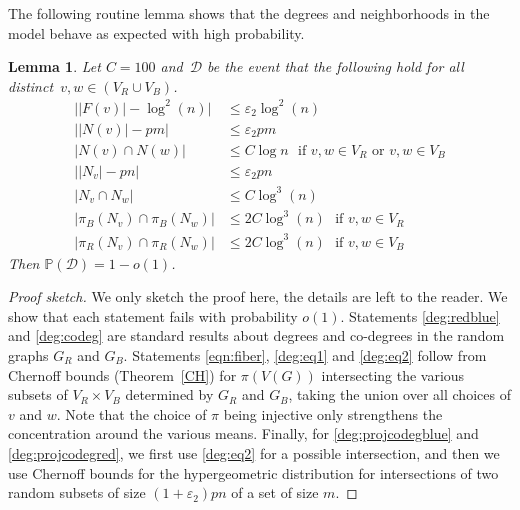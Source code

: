 \documentclass{article}
\newcommand{\p}{\mathbb{P}}
\newtheorem{lemma}[theorem]{Lemma}
\begin{document}
The following routine lemma shows that the degrees and neighborhoods in the model behave as expected with high probability. 
\begin{lemma}\label{lem:fiber_and_degree}
 Let $C=100$ %
 and~$\mathcal{D}$ be the event that the following hold for all distinct~$v,w \in (V_R \cup V_B)$.
    \begin{align} 
    \big| |F(v)| - \log^2 (n) \big| &\leq \varepsilon_2 \log^2 (n)
    \label{eqn:fiber}\\
    \big| |N(v)| - p{m} \big| & \leq \varepsilon_2 p{m}\label{deg:redblue} \\ 
	|N(v) \cap N(w)| & \leq C \log n \mbox{ ~if $v, w \in V_R$ or $v, w \in V_B$} \label{deg:codeg}\\   
    \big| |N_v|-pn \big| &\leq \varepsilon_2 pn \label{deg:eq1}\\
	|N_v \cap N_w| &\leq C \log^3 (n)  \label{deg:eq2}\\
	|\pi_B(N_v) \cap \pi_B(N_w)| &\leq 2C\log^3 (n) \mbox{ ~if $v, w \in V_R$} \label{deg:projcodegblue}
\\	|\pi_R(N_v) \cap \pi_R(N_w)| &\leq 2C \log^3 (n) \mbox{ ~if $v, w \in V_B$} \label{deg:projcodegred}
    \end{align}
    Then $\p(\mathcal{D})=1-o(1)$.
\end{lemma}
\begin{proof}[Proof sketch]
We only sketch the proof here, the details are left to the reader.
    We show that each statement fails with probability $o(1)$. Statements \eqref{deg:redblue} and \eqref{deg:codeg} are standard results about degrees and co-degrees in the random graphs $G_R$ and $G_B$. 
    Statements \eqref{eqn:fiber}, \eqref{deg:eq1} and \eqref{deg:eq2} follow from Chernoff bounds (Theorem~\ref{CH}) for $\pi(V(G))$ intersecting the various subsets of $V_R\times V_B$ determined by $G_R$ and $G_B$, taking the union over all choices of $v$ and $w$. Note that the choice of $\pi$ being injective only strengthens the concentration around the various means. Finally, for \eqref{deg:projcodegblue} and \eqref{deg:projcodegred}, we first use \eqref{deg:eq2} for a possible intersection, and then we use Chernoff bounds for the hypergeometric distribution for intersections of two random subsets of size  $(1+\varepsilon_2)pn$ of a set of size ${m}$.
\end{proof}
\end{document}
